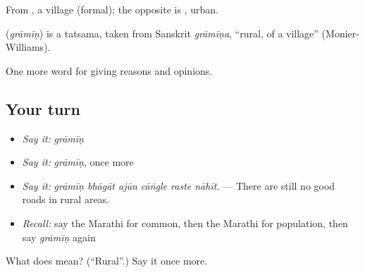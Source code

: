 From , a village (formal); the opposite is , urban.

\begin{cousinweb}
\textbf{} (\emph{grāmīṇ}) is a tatsama, taken from Sanskrit \emph{grāmīṇa}, \textquotedblleft{}rural, of a village\textquotedblright{} (Monier-Williams).
\end{cousinweb}

\begin{grammarlens}[title={What you've built}]
One more word for giving reasons and opinions.
\end{grammarlens}

\subsection*{Your turn}
\begin{itemize}
\raggedright
  \item \emph{Say it:} \emph{grāmīṇ}
  \item \emph{Say it:} \emph{grāmīṇ}, once more
  \item \emph{Say it:} \emph{grāmīṇ bhāgāt ajūn cāṅgle raste nāhīt.} — There are still no good roads in rural areas.
  \item \emph{Recall:} say the Marathi for common, then the Marathi for population, then say \emph{grāmīṇ} again
\end{itemize}

\begin{tcolorbox}[breakable,colback=teal!4,colframe=teal!35!black,title={Before you move on}]
What does  mean? (\textquotedblleft{}Rural\textquotedblright{}.) Say it once more.
\end{tcolorbox}

